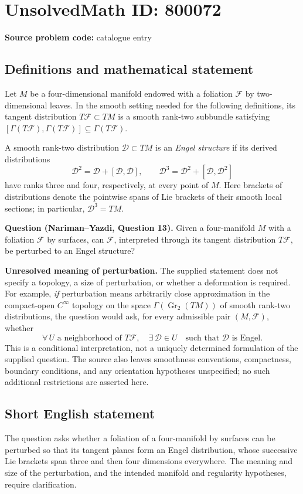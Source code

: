 \documentclass[11pt]{article}
\begin{document}
\section*{UnsolvedMath ID: 800072}
\textbf{Source problem code:} catalogue entry
\subsection{Definitions and mathematical statement}
Let \(M\) be a four-dimensional manifold endowed with a foliation \(\mathcal F\) by two-dimensional leaves. In the smooth setting needed for the following definitions, its tangent distribution \(T\mathcal F\subset TM\) is a smooth rank-two subbundle satisfying \([\Gamma(T\mathcal F),\Gamma(T\mathcal F)]\subseteq\Gamma(T\mathcal F)\).

A smooth rank-two distribution \(\mathcal D\subset TM\) is an \emph{Engel structure} if its derived distributions
\[
\mathcal D^{2}=\mathcal D+[\mathcal D,\mathcal D],\qquad
\mathcal D^{3}=\mathcal D^{2}+[\mathcal D,\mathcal D^{2}]
\]
have ranks three and four, respectively, at every point of \(M\). Here brackets of distributions denote the pointwise spans of Lie brackets of their smooth local sections; in particular, \(\mathcal D^{3}=TM\).

\textbf{Question (Nariman--Yazdi, Question 13).} Given a four-manifold \(M\) with a foliation \(\mathcal F\) by surfaces, can \(\mathcal F\), interpreted through its tangent distribution \(T\mathcal F\), be perturbed to an Engel structure?

\textbf{Unresolved meaning of perturbation.} The supplied statement does not specify a topology, a size of perturbation, or whether a deformation is required. For example, \emph{if} perturbation means arbitrarily close approximation in the compact-open \(C^{\infty}\) topology on the space \(\Gamma(\operatorname{Gr}_{2}(TM))\) of smooth rank-two distributions, the question would ask, for every admissible pair \((M,\mathcal F)\), whether
\[
\forall\,U\text{ a neighborhood of }T\mathcal F,
\quad \exists\,\mathcal D\in U
\quad\text{such that }\mathcal D\text{ is Engel}.
\]
This is a conditional interpretation, not a uniquely determined formulation of the supplied question. The source also leaves smoothness conventions, compactness, boundary conditions, and any orientation hypotheses unspecified; no such additional restrictions are asserted here.
\subsection{Short English statement}
The question asks whether a foliation of a four-manifold by surfaces can be perturbed so that its tangent planes form an Engel distribution, whose successive Lie brackets span three and then four dimensions everywhere. The meaning and size of the perturbation, and the intended manifold and regularity hypotheses, require clarification.
\end{document}
